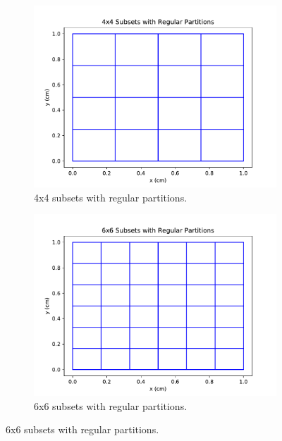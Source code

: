 \documentclass[times,final]{elsarticle}
\begin{document}
\begin{figure}[H]
\centering
\begin{subfigure}[b]{0.45\textwidth}
  \includegraphics[width=\textwidth]{../Dissertation/cut_line_files/4_regular.pdf}
  \caption{4x4 subsets with regular partitions.}
  \label{4regular}
\end{subfigure}
\begin{subfigure}[b]{0.45\textwidth}
  \includegraphics[width=\textwidth]{../Dissertation/cut_line_files/6_regular.pdf}
  \caption{6x6 subsets with regular partitions.}
  \label{6regular}
\end{subfigure}


\end{figure}
\end{document}
